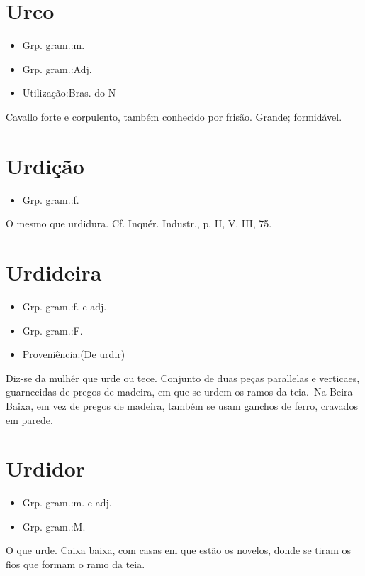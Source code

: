 \documentclass{article}
\begin{document}
\section{Urco}
\begin{itemize}
\item {Grp. gram.:m.}
\end{itemize}
\begin{itemize}
\item {Grp. gram.:Adj.}
\end{itemize}
\begin{itemize}
\item {Utilização:Bras. do N}
\end{itemize}
Cavallo forte e corpulento, também conhecido por \textunderscore frisão\textunderscore .
Grande; formidável.
\section{Urdição}
\begin{itemize}
\item {Grp. gram.:f.}
\end{itemize}
O mesmo que \textunderscore urdidura\textunderscore . Cf. \textunderscore Inquér. Industr.\textunderscore , p. II, V. III, 75.
\section{Urdideira}
\begin{itemize}
\item {Grp. gram.:f.  e  adj.}
\end{itemize}
\begin{itemize}
\item {Grp. gram.:F.}
\end{itemize}
\begin{itemize}
\item {Proveniência:(De \textunderscore urdir\textunderscore )}
\end{itemize}
Diz-se da mulhér que urde ou tece.
Conjunto de duas peças parallelas e verticaes, guarnecidas de pregos de madeira, em que se urdem os ramos da teia.--Na Beira-Baixa, em vez de pregos de madeira, também se usam ganchos de ferro, cravados em parede.
\section{Urdidor}
\begin{itemize}
\item {Grp. gram.:m.  e  adj.}
\end{itemize}
\begin{itemize}
\item {Grp. gram.:M.}
\end{itemize}
O que urde.
Caixa baixa, com casas em que estão os novelos, donde se tiram os fios que formam o ramo da teia.
\end{document}
